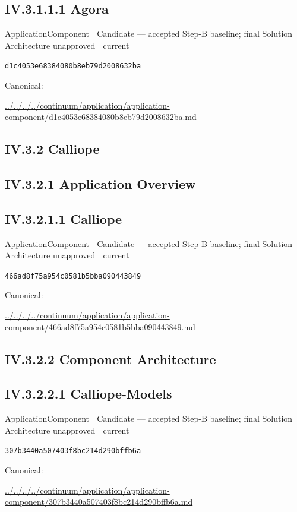 \documentclass[10pt,a4paper]{article}
\begin{document}
\subsection*{IV.3.1.1.1 Agora}
\label{element-d1c4053e68384080b8eb79d2008632ba}
{\small ApplicationComponent | Candidate — accepted Step-B baseline; final Solution Architecture unapproved | current}\par
\texttt{d1c4053e68384080b8eb79d2008632ba}\par
Canonical: \par
{\footnotesize\url{../../../../continuum/application/application-component/d1c4053e68384080b8eb79d2008632ba.md}}\par
\subsection*{IV.3.2 Calliope}
\subsection*{IV.3.2.1 Application Overview}
\subsection*{IV.3.2.1.1 Calliope}
\label{element-466ad8f75a954c0581b5bba090443849}
{\small ApplicationComponent | Candidate — accepted Step-B baseline; final Solution Architecture unapproved | current}\par
\texttt{466ad8f75a954c0581b5bba090443849}\par
Canonical: \par
{\footnotesize\url{../../../../continuum/application/application-component/466ad8f75a954c0581b5bba090443849.md}}\par
\subsection*{IV.3.2.2 Component Architecture}
\subsection*{IV.3.2.2.1 Calliope-Models}
\label{element-307b3440a507403f8bc214d290bffb6a}
{\small ApplicationComponent | Candidate — accepted Step-B baseline; final Solution Architecture unapproved | current}\par
\texttt{307b3440a507403f8bc214d290bffb6a}\par
Canonical: \par
{\footnotesize\url{../../../../continuum/application/application-component/307b3440a507403f8bc214d290bffb6a.md}}\par
\end{document}
